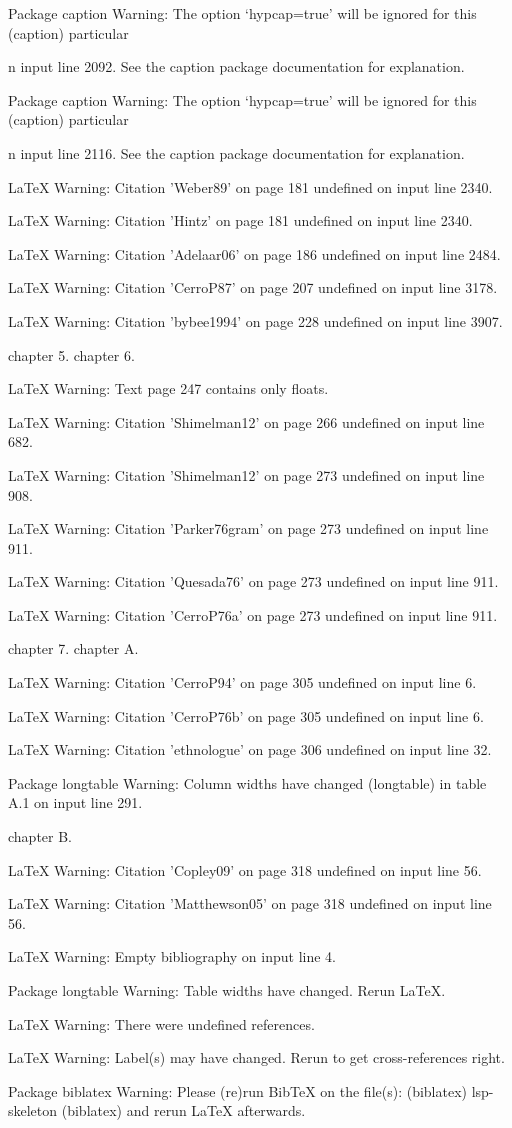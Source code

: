 Package caption Warning: The option `hypcap=true' will be ignored for this
(caption)                particular \caption on input line 2092.
See the caption package documentation for explanation.


Package caption Warning: The option `hypcap=true' will be ignored for this
(caption)                particular \caption on input line 2116.
See the caption package documentation for explanation.


LaTeX Warning: Citation 'Weber89' on page 181 undefined on input line 2340.


LaTeX Warning: Citation 'Hintz' on page 181 undefined on input line 2340.


LaTeX Warning: Citation 'Adelaar06' on page 186 undefined on input line 2484.


LaTeX Warning: Citation 'CerroP87' on page 207 undefined on input line 3178.


LaTeX Warning: Citation 'bybee1994' on page 228 undefined on input line 3907.

chapter 5.
chapter 6.

LaTeX Warning: Text page 247 contains only floats.


LaTeX Warning: Citation 'Shimelman12' on page 266 undefined on input line 682.


LaTeX Warning: Citation 'Shimelman12' on page 273 undefined on input line 908.


LaTeX Warning: Citation 'Parker76gram' on page 273 undefined on input line 911.


LaTeX Warning: Citation 'Quesada76' on page 273 undefined on input line 911.


LaTeX Warning: Citation 'CerroP76a' on page 273 undefined on input line 911.

chapter 7.
chapter A.

LaTeX Warning: Citation 'CerroP94' on page 305 undefined on input line 6.


LaTeX Warning: Citation 'CerroP76b' on page 305 undefined on input line 6.


LaTeX Warning: Citation 'ethnologue' on page 306 undefined on input line 32.


Package longtable Warning: Column widths have changed
(longtable)                in table \relax A.1 on input line 291.

chapter B.

LaTeX Warning: Citation 'Copley09' on page 318 undefined on input line 56.


LaTeX Warning: Citation 'Matthewson05' on page 318 undefined on input line 56.


LaTeX Warning: Empty bibliography on input line 4.




Package longtable Warning: Table widths have changed. Rerun LaTeX.


LaTeX Warning: There were undefined references.


LaTeX Warning: Label(s) may have changed. Rerun to get cross-references right.


Package biblatex Warning: Please (re)run BibTeX on the file(s):
(biblatex)                lsp-skeleton
(biblatex)                and rerun LaTeX afterwards.

